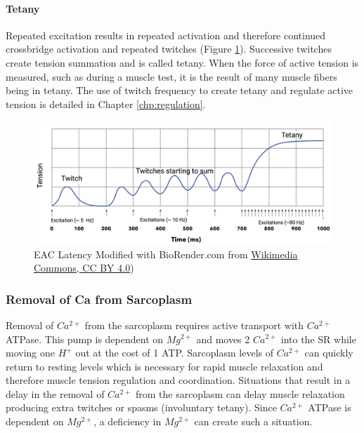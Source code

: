 

\paragraph{Tetany}
Repeated excitation results in repeated activation and therefore continued crossbridge activation and repeated twitches (Figure \ref{fig:tetany}). Successive twitches create tension summation and is called tetany. When the force of active tension is measured, such as during a muscle test, it is the result of many muscle fibers being in tetany. The use of twitch frequency to create tetany and regulate active tension is detailed in Chapter \ref{chp:regulation}. 

\begin{figure}[!ht]
    \centering
    \includegraphics[width=1\linewidth]{./figure/tetany.png}
    \caption{EAC Latency \footnotesize{Modified with BioRender.com from \href{https://commons.wikimedia.org/wiki/File:Twitch_vs_unfused_tetanus_vs_fused_tetanus.png}{Wikimedia Commons, CC BY 4.0})}}
    \label{fig:tetany}
\end{figure}

\subsubsection{Removal of Ca from Sarcoplasm}
Removal of $Ca^{2+}$ from the sarcoplasm requires active transport with $Ca^{2+}$ ATPase. This pump is dependent on $Mg^{2+}$ and moves 2 $Ca^{2+}$ into the SR while moving one $H^+$ out at the cost of 1 ATP. Sarcoplasm levels of $Ca^{2+}$ can quickly return to resting levels which is necessary for rapid muscle relaxation and therefore muscle tension regulation and coordination. Situations that result in a delay in the removal of $Ca^{2+}$ from the sarcoplasm can delay muscle relaxation producing extra twitches or spasms (involuntary tetany). Since $Ca^{2+}$ ATPase is dependent on $Mg^{2+}$, a deficiency in $Mg^{2+}$ can create such a situation.

